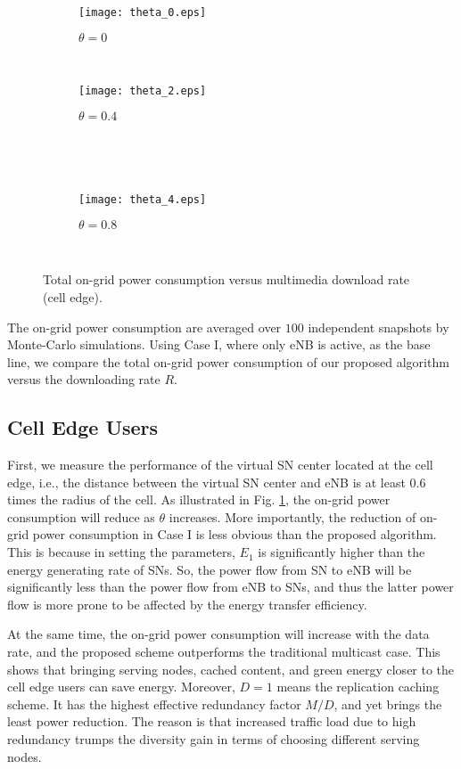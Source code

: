 \documentclass[journal,12pt,onecolumn]{IEEEtran}
\begin{document}
\begin{figure}
\vspace{-1em}
\centering   
                \begin{subfigure}[!t]{3 in}
                \texttt{[image: theta\_0.eps]}\caption{$\theta=0$}
\end{subfigure}
        ~
        
        \begin{subfigure}[!t]{3 in}
                \texttt{[image: theta\_2.eps]}\caption{$\theta=0.4$}
\end{subfigure}~
        
         ~\begin{subfigure}[!t]{3 in}
                \texttt{[image: theta\_4.eps]}\caption{$\theta=0.8$}
\end{subfigure}
        ~ 

        \caption{Total on-grid power consumption versus multimedia download rate (cell edge).}\label{result}
\end{figure}

The on-grid power consumption are averaged over $100$ independent snapshots by Monte-Carlo simulations. Using Case I, where only eNB is active, as the base line, we compare the total on-grid power consumption of our proposed algorithm versus the downloading rate $R$.
 


\subsection{Cell Edge Users}
First, we measure the performance of the virtual SN center located at the cell edge, i.e., the distance between the virtual SN center and eNB is at least $0.6$ times the radius of the cell. As illustrated in Fig. \ref{result},  the on-grid power consumption will reduce as $\theta$ increases. More importantly, the reduction of on-grid power consumption in Case I is less obvious than the proposed algorithm. This is because in setting the parameters, $E_1$ is significantly higher than the energy generating rate of SNs. So, the power flow from SN to eNB will be significantly less than the power flow from eNB to SNs, and thus the latter power flow is more prone to be affected by the energy transfer efficiency.

At the same time, the on-grid power consumption will increase with the data rate, and the proposed scheme outperforms the traditional multicast case. This shows that bringing serving nodes, cached content, and green energy closer to the cell edge users can save energy. Moreover, $D=1$ means the replication caching scheme. It has the highest effective redundancy factor $M/D$, and yet brings the least power reduction. The reason is that increased traffic load due to high redundancy trumps the diversity gain in terms of choosing different serving nodes. 
\end{document}
